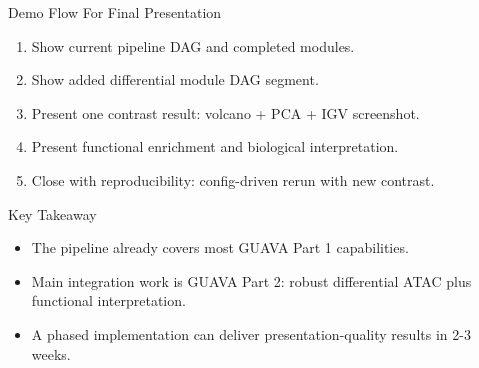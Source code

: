 \documentclass[aspectratio=169]{beamer}
\begin{document}
\begin{frame}{Demo Flow For Final Presentation}
\begin{enumerate}
  \item Show current pipeline DAG and completed modules.
  \item Show added differential module DAG segment.
  \item Present one contrast result: volcano + PCA + IGV screenshot.
  \item Present functional enrichment and biological interpretation.
  \item Close with reproducibility: config-driven rerun with new contrast.
\end{enumerate}
\end{frame}

\begin{frame}{Key Takeaway}
\begin{itemize}
  \item The pipeline already covers most GUAVA Part 1 capabilities.
  \item Main integration work is GUAVA Part 2: robust differential ATAC plus functional interpretation.
  \item A phased implementation can deliver presentation-quality results in 2-3 weeks.
\end{itemize}
\end{frame}
\end{document}
